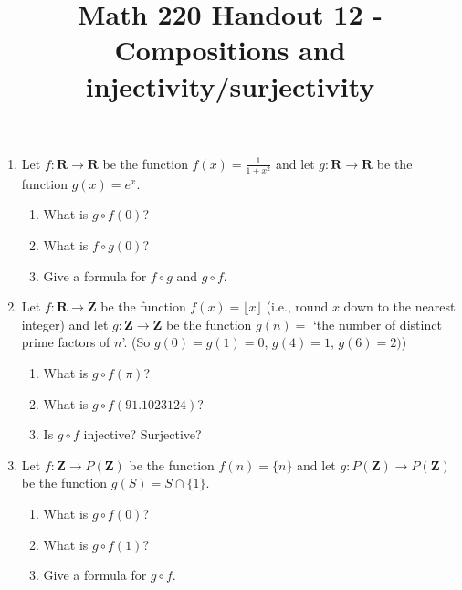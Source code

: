 \documentclass[12pt, reqno]{amsart}
\begin{document}
\title[Math 220 Handout 12 - Compositions and injectivity/surjectivity]{Math 220 Handout 12 - Compositions and injectivity/surjectivity}\maketitle


\begin{enumerate}


\item Let $f\colon \mathbf{R} \to \mathbf{R}$ be the function $f(x) = \frac{1}{1+x^2}$
  and let  $g\colon \mathbf{R} \to \mathbf{R}$ be the function $g(x) = e^x$. \vspace{6pt}

  \begin{enumerate}
  \item What is $g \circ f(0)$?
  \item What is $f \circ g(0)$?
  \item Give a formula for $f \circ g$ and $g \circ f$.
  \end{enumerate} \vspace{1.5in}

\item Let $f\colon \mathbf{R} \to \mathbf{Z}$ be the function $f(x) = \lfloor x \rfloor$ (i.e., round
  $x$ down to the nearest integer)
  and let  $g\colon \mathbf{Z} \to \mathbf{Z}$ be the function $g(n) = $ `the number
  of distinct
  prime factors of $n$'. (So $g(0) = g(1) = 0$, $g(4) = 1$, $g(6) =
  2)$) \vspace{6pt}

  \begin{enumerate}
  \item What is $g \circ f(\pi)$?
  \item What is $g \circ f(91.1023124)$?
  \item Is $g \circ f$ injective? Surjective?
  \end{enumerate} \vspace{1.5in}

\item Let $f\colon \mathbf{Z} \to P(\mathbf{Z})$ be the function $f(n) = \{n\}$
  and let  $g\colon P(\mathbf{Z}) \to P(\mathbf{Z})$ be the function $g(S) = S \cap \{1\}$. \vspace{6pt}

  \begin{enumerate}
  \item What is $g \circ f(0)$?
  \item What is $g \circ f(1)$?
  \item Give a formula for $g \circ f$.
  \end{enumerate} \vspace{1in}



\end{enumerate}
\end{document}
